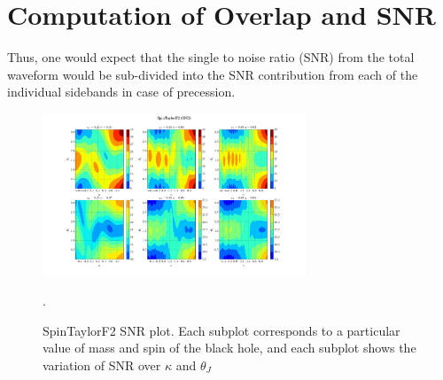 \section{Computation of Overlap and SNR}

Thus, one would expect that the single to noise ratio (SNR) from the total waveform would be sub-divided
into the SNR contribution from each of the individual sidebands in case of precession. 

\label{SNR}
\begin{figure}[h]
\includegraphics[width=0.7\textwidth]{./images/SNR_GRID_0F.pdf}
\centering
\caption{SpinTaylorF2 SNR plot. Each subplot corresponds to a particular value of mass and spin of the black hole, and each subplot shows the variation of SNR over $\kappa$ and $\theta_{J}$}.
\end{figure}

